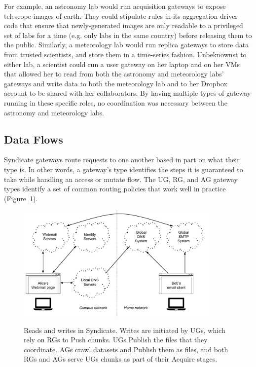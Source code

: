 For example, an astronomy lab would
run acquisition gateways to expose telescope images of earth.  They could stipulate rules
in its aggregation driver code that ensure that newly-generated images are only
readable to a privileged set of labs for a time (e.g. only labs in the same
country) before releasing them to the public.  Similarly, a meteorology
lab would run replica gateways to store data from trusted scientists, and
store them in a time-series fashion.  Unbeknownst to either lab, a scientist could
run a user gateway on her laptop and on her VMs that allowed her to read from both the
astronomy and meteorology labs' gateways and write data to both the meteorology
lab and to her Dropbox account to be shared with her collaborators.  By having
multiple types of gateway running in these specific roles, no coordination was
necessary between the astronomy and meteorology labs.

\subsection{Data Flows}

Syndicate gateways route requests to one another based in part on what their
type is.  In other words, a gateway's type identifies the steps it is guaranteed
to take while handling an access or mutate flow.
The UG, RG, and AG gateway types identify a set of common routing policies that
work well in practice
(Figure~\ref{fig:chap3-syndicate-reads-writes}).

\begin{figure}[h]
   \caption{Reads and writes in Syndicate.  Writes are initiated by UGs, which
   rely on RGs to Push chunks.  UGs Publish the files that they coordinate.  AGs
   crawl datasets and Publish them as files, and both RGs and AGs serve UGs
   chunks as part of their Acquire stages.}
   \centering
   \includegraphics[width=0.9\textwidth,page=21]{figures/dissertation-figures}
   \label{fig:chap3-syndicate-reads-writes}
\end{figure}

